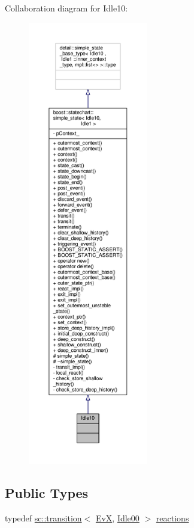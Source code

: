 Collaboration diagram for Idle10\+:
\nopagebreak
\begin{figure}[H]
\begin{center}
\leavevmode
\includegraphics[height=550pt]{struct_idle10__coll__graph}
\end{center}
\end{figure}
\subsection*{Public Types}
\begin{DoxyCompactItemize}
\item 
typedef \mbox{\hyperlink{classboost_1_1statechart_1_1transition}{sc\+::transition}}$<$ \mbox{\hyperlink{struct_ev_x}{EvX}}, \mbox{\hyperlink{struct_idle00}{Idle00}} $>$ \mbox{\hyperlink{struct_idle10_a1d49901702603a8324b8bac9b757476c}{reactions}}
\end{DoxyCompactItemize}
